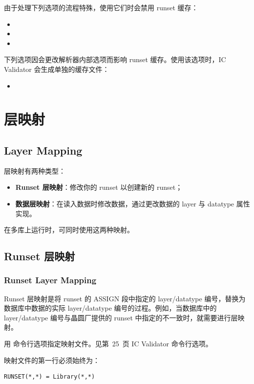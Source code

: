 由于处理下列选项的流程特殊，使用它们时会禁用 runset 缓存：
\begin{itemize}
  \item {}
  \item {}
  \item {}
\end{itemize}

下列选项因会更改解析器内部选项而影响 runset 缓存。使用该选项时，IC Validator 会生成单独的缓存文件：
\begin{itemize}
  \item {}
\end{itemize}

\section{层映射}
\subsection*{Layer Mapping}

层映射有两种类型：
\begin{itemize}
  \item \textbf{Runset 层映射}：修改你的 runset 以创建新的 runset；
  \item \textbf{数据层映射}：在读入数据时修改数据，通过更改数据的 layer 与 datatype 属性实现。
\end{itemize}

在多库上运行时，可同时使用这两种映射。

\subsection{Runset 层映射}
\subsubsection*{Runset Layer Mapping}

Runset 层映射是将 runset 的 ASSIGN 段中指定的 layer/datatype 编号，替换为数据库中数据的实际 layer/datatype 编号的过程。例如，当数据库中的 layer/datatype 编号与晶圆厂提供的 runset 中指定的不一致时，就需要进行层映射。

用  命令行选项指定映射文件。见第~25~页 IC Validator 命令行选项。

映射文件的第一行必须始终为：
\begin{lstlisting}
RUNSET(*,*) = Library(*,*)
\end{lstlisting}

